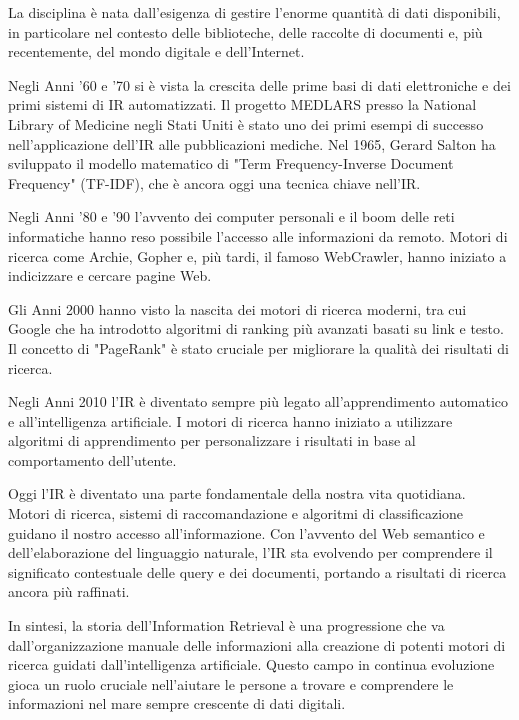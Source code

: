 La disciplina è nata dall'esigenza di gestire l'enorme quantità di dati disponibili, in particolare nel contesto delle biblioteche, delle raccolte di documenti e,
più recentemente, del mondo digitale e dell'Internet.

Negli Anni '60 e '70 si è vista la crescita delle prime basi di dati elettroniche e dei primi sistemi di IR automatizzati. Il progetto MEDLARS presso la National Library of Medicine negli Stati Uniti è stato uno dei primi esempi di successo nell'applicazione dell'IR alle pubblicazioni mediche. Nel 1965, Gerard Salton ha sviluppato il modello matematico di "Term Frequency-Inverse Document Frequency" (TF-IDF), che è ancora oggi una tecnica chiave nell'IR.

Negli Anni '80 e '90 l'avvento dei computer personali e il boom delle reti informatiche hanno reso possibile l'accesso alle informazioni da remoto. Motori di ricerca come Archie, Gopher e, più tardi, il famoso WebCrawler, hanno iniziato a indicizzare e cercare pagine Web.

Gli Anni 2000 hanno visto la nascita dei motori di ricerca moderni, tra cui Google che ha introdotto algoritmi di ranking più avanzati basati su link e testo. Il concetto di "PageRank" è stato cruciale per migliorare la qualità dei risultati di ricerca.

Negli Anni 2010 l'IR è diventato sempre più legato all'apprendimento automatico e all'intelligenza artificiale. I motori di ricerca hanno iniziato a utilizzare algoritmi di apprendimento per personalizzare i risultati in base al comportamento dell'utente.

Oggi l'IR è diventato una parte fondamentale della nostra vita quotidiana. Motori di ricerca, sistemi di raccomandazione e algoritmi di classificazione guidano il nostro accesso all'informazione. Con l'avvento del Web semantico e dell'elaborazione del linguaggio naturale, l'IR sta evolvendo per comprendere il significato contestuale delle query e dei documenti, portando a risultati di ricerca ancora più raffinati.

In sintesi, la storia dell'Information Retrieval è una progressione che va dall'organizzazione manuale delle informazioni alla creazione di potenti motori di ricerca guidati dall'intelligenza artificiale. Questo campo in continua evoluzione gioca un ruolo cruciale nell'aiutare le persone a trovare e comprendere le informazioni nel mare sempre crescente di dati digitali.